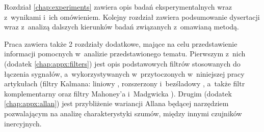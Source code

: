 Rozdział \ref{chap:experiments} zawiera opis badań eksperymentalnych wraz z~wynikami i~ich omówieniem. Kolejny rozdział zawiera podsumowanie dysertacji wraz z~analizą dalszych kierunków badań związanych z~omawianą metodą.

Praca zawiera także 2 rozdziały dodatkowe, mające na celu przedstawienie informacji pomocnych w~analizie przedstawionego tematu. Pierwszym z~nich (dodatek \ref{chap:appx:filters}) jest opis podstawowych filtrów stosowanych do łączenia sygnałów, a~wykorzystywanych w~przytoczonych w~niniejszej pracy artykułach (filtry Kalmana: liniowy \cite{Kalman1960}, rozszerzony \cite{smith1962application} i~bezśladowy \cite{Julier1995}, a~także filtr komplementarny \cite{Euston2008} oraz filtry Mahoney'a \cite{Baldwin2007} i~Madgwicka \cite{Madgwick2010}). Drugim (dodatek \ref{chap:appx:allan}) jest przybliżenie wariancji Allana \cite{Allan1966}  będącej narzędziem pozwalającym na analizę charakterystyki szumów, między innymi czujników inercyjnych.